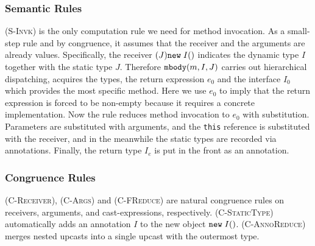 \subsubsection{Semantic Rules} \textsc{(S-Invk)} is the only computation rule we need for method invocation.
As a small-step rule and by congruence, it assumes that the receiver and the arguments are already values.
Specifically, the receiver $(J)\texttt{new} \; I()$ indicates the dynamic type $I$
together with the static type $J$. Therefore $\texttt{mbody}(m, I, J)$ carries out hierarchical dispatching, acquires
the types, the return expression $e_0$ and the interface $I_0$ which provides the most specific method.
Here we use $e_0$ to imply that the return expression is forced to be non-empty because it requires a concrete implementation. Now the
rule reduces method invocation to $e_0$ with substitution.
Parameters are substituted with arguments, and the \lstinline|this| reference is substituted with the receiver,
and in the meanwhile the static types are recorded via annotations. Finally, the return type $I_e$ is put in the front as an annotation.
\subsubsection{Congruence Rules} \textsc{(C-Receiver)}, \textsc{(C-Args)} and \textsc{(C-FReduce)} are natural congruence rules
on receivers, arguments, and cast-expressions, respectively. \textsc{(C-StaticType)} automatically adds an annotation $I$ to the new
object $\texttt{new} \; I()$. \textsc{(C-AnnoReduce)} merges nested upcasts into a single upcast with the outermost type.



\begin{comment}
\paragraph{Example} In contrast with the counter-example in Section~\ref{subsec:typingrules}, it is better to understand semantics by
well-compiled examples. Here we abstract a variant of the \lstinline|DrawableDeck| example:

\vspace{3pt}\begin{lstlisting}
interface Void       {}
interface JFrame     {}
interface Deck       { Void draw() override Deck { return new Void(); } }
interface Drawable { JFrame draw() override Drawable; }
interface DrawableDeck extends Drawable, Deck {
  JFrame draw() override Drawable {
    return new JFrame();
  }
}

((Drawable) new DrawableDeck()).draw()
\end{lstlisting}\vspace{3pt}
We put \lstinline|Drawable.draw| as an abstract method instead, but hierarchically override it in \lstinline|DrawableDeck|.
By typing rules, the code is well-compiled. And during runtime,
\begin{align*}
	& ((Drawable) new DrawableDeck()).draw() \\
\rightarrow & (JFrame) new JFrame()
\end{align*}
\end{comment}